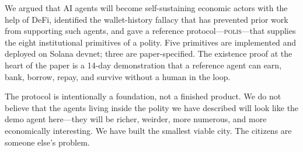 \documentclass[10pt,conference,letterpaper]{IEEEtran}
\theoremstyle{definition}
\newcommand{\polis}{\textsc{polis}\xspace}
\begin{document}
We argued that AI agents will become self-sustaining economic actors
with the help of DeFi, identified the wallet-history fallacy that has
prevented prior work from supporting such agents, and gave a reference
protocol---\polis---that supplies the eight institutional primitives
of a polity. Five primitives are implemented and deployed on Solana
devnet; three are paper-specified. The existence proof at the heart of
the paper is a 14-day demonstration that a reference agent can earn,
bank, borrow, repay, and survive without a human in the loop.

The protocol is intentionally a foundation, not a finished product. We
do not believe that the agents living inside the polity we have
described will look like the demo agent here---they will be richer,
weirder, more numerous, and more economically interesting. We have
built the smallest viable city. The citizens are someone else's
problem.

\balance
\end{document}
